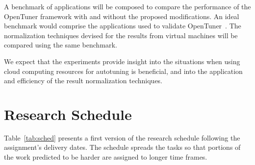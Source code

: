 \documentclass[a4paper, 12pt]{article}
\begin{document}
A benchmark of applications will be composed to compare the performance of
the OpenTuner framework with and without the proposed modifications.
An ideal benchmark would comprise the applications used to validate
OpenTuner~\cite{ansel2014opentuner}.
The normalization techniques devised for the results from virtual machines
will be compared using the same benchmark.

We expect that the experiments provide insight into the situations
when using cloud computing resources for autotuning is beneficial,
and into the application and efficiency of the result normalization
techniques.

\section{Research Schedule} \label{sec:sched}

Table~\ref{tab:sched} presents a first version of the research schedule
following the assignment's delivery dates.
The schedule spreads the tasks so that portions of the work
predicted to be harder are assigned to longer time frames.

\newcommand{\specialcell}[2][c]{%
  \begin{tabular}[#1]{@{}K@{}}#2\end{tabular}}
\end{document}
